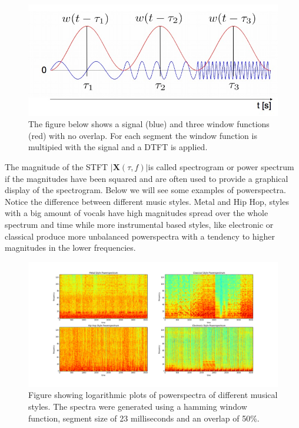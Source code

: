 \documentclass[cic,tc,english]{iiufrgs}
\begin{document}
\begin{figure}
    \caption{The figure below shows a signal (blue) and three window functions (red) with no overlap. For each segment the window function is multipied with the signal and a DTFT is applied.}
    \begin{center}
        \includegraphics[width=\linewidth]{STFT}
    \end{center}
    \label{fig:stft}
\end{figure}

The magnitude of the STFT $\vert \bm{X}(\tau,f) \vert $is called spectrogram or power spectrum if the magnitudes have been squared and are often used to provide a graphical display of the spectrogram. Below we will see some examples of powerspectra. Notice the difference between different music styles. Metal and Hip Hop, styles with a big amount of vocals have high magnitudes spread over the whole spectrum and time while more instrumental based styles, like electronic or classical produce more unbalanced powerspectra with a tendency to higher magnitudes in the lower frequencies. 

\begin{figure}
    \caption{Figure showing logarithmic plots of powerspectra of different musical styles. The spectra were generated using a hamming window function, segment size of 23 milliseconds and an overlap of 50\%.}
    \begin{center}
        \includegraphics[trim=140 0 140 0, clip, width=\linewidth]{powerspectra}
    \end{center}
    \label{fig:powerspectra}
\end{figure}
\end{document}
